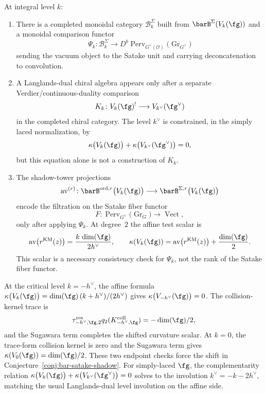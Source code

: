 \begin{conjecture}
\label{conj:bar-satake-shadow}
At integral level $k$:
\begin{enumerate}[label=\textup{(\arabic*)}]
\item There is a completed monoidal category
 $\mathcal B_k^{\Sigma}$ built from
 $\barB^{\Sigma}(V_k(\fg))$ and a monoidal comparison functor
 \[
  \Psi_k\colon \mathcal B_k^{\Sigma}
  \longrightarrow
  D^b\operatorname{Perv}_{G^\vee(\mathcal O)}
  \bigl(\operatorname{Gr}_{G^\vee}\bigr)
 \]
 sending the vacuum object to the Satake unit and carrying
 deconcatenation to convolution.
\item A Langlands-dual chiral algebra appears only after a separate
 Verdier/continuous-duality comparison
 \[
  K_k\colon V_k(\fg)^! \longrightarrow V_{k^\vee}(\fg^\vee)
 \]
 in the completed chiral category. The level $k^\vee$ is constrained,
 in the simply laced normalization, by
 \[
 \kappa\bigl(V_k(\fg)\bigr) +
 \kappa\bigl(V_{k^\vee}(\fg^\vee)\bigr) = 0,
 \]
 but this equation alone is not a construction of $K_k$.
\item The shadow-tower projections
 \[
 \operatorname{av}^{(r)} \colon
 \barB^{\mathrm{ord},r}\bigl(V_k(\fg)\bigr)
 \longrightarrow
 \barB^{\Sigma,r}\bigl(V_k(\fg)\bigr)
 \]
 encode the filtration on the Satake fiber functor
 \[
 F \colon
 \operatorname{Perv}_{G^\vee}\bigl(\operatorname{Gr}_G\bigr)
 \longrightarrow
 \operatorname{Vect},
 \]
 only after applying $\Psi_k$. At degree~$2$ the affine test scalar is
 \[
  \operatorname{av}\bigl(r^{\mathrm{KM}}(z)\bigr)
  = \frac{k\,\dim(\fg)}{2h^\vee},
  \qquad
  \kappa(V_k(\fg))
  =
  \operatorname{av}\bigl(r^{\mathrm{KM}}(z)\bigr)
  + \frac{\dim(\fg)}{2}.
 \]
 This scalar is a necessary consistency check for $\Psi_k$, not the
 rank of the Satake fiber functor.
\end{enumerate}
\end{conjecture}

\begin{remark}
At the critical level $k = -h^\vee$, the affine formula
$\kappa\bigl(V_k(\fg)\bigr) = \dim(\fg)\,(k+h^\vee)/(2h^\vee)$ gives
$\kappa\bigl(V_{-h^\vee}(\fg)\bigr)=0$.  The collision-kernel trace is
\[
 \tau_{-h^\vee,\fg,2}^{\mathrm{res}}
 q_2(K_{-h^\vee,\fg}^{\mathrm{coll}})=-\dim(\fg)/2,
\]
and the Sugawara term completes the shifted curvature scalar.  At
$k=0$, the trace-form collision kernel is zero and the Sugawara term
gives $\kappa(V_0(\fg))=\dim(\fg)/2$. These two endpoint checks force the
shift in Conjecture~\ref{conj:bar-satake-shadow}. For simply-laced
$\fg$, the complementarity relation
$\kappa\bigl(V_k(\fg)\bigr) + \kappa\bigl(V_{k^\vee}(\fg^\vee)\bigr) = 0$
solves to the involution $k^\vee = -k - 2h^\vee$, matching the usual
Langlands-dual level involution on the affine side.
\end{remark}

